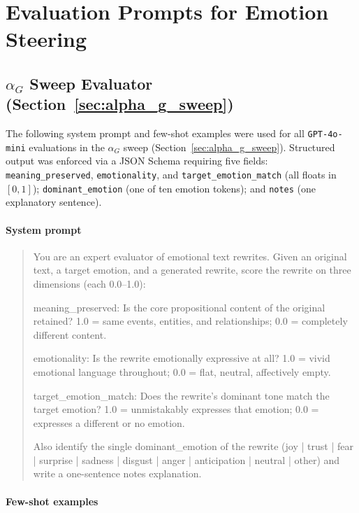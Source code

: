 \section{Evaluation Prompts for Emotion Steering}
\label{app:eval_prompts}

\subsection{\texorpdfstring{$\alpha_G$}{alphaG} Sweep Evaluator (Section~\ref{sec:alpha_g_sweep})}
\label{app:eval_prompt_ag}

The following system prompt and few-shot examples were used for all \texttt{GPT-4o-mini}
evaluations in the $\alpha_G$ sweep (Section~\ref{sec:alpha_g_sweep}).
Structured output was enforced via a JSON Schema requiring five fields:
\texttt{meaning\_preserved}, \texttt{emotionality}, and \texttt{target\_emotion\_match} (all floats in $[0,1]$);
\texttt{dominant\_emotion} (one of ten emotion tokens); and \texttt{notes} (one explanatory sentence).

\paragraph{System prompt}
\begin{quote}
\small\ttfamily
You are an expert evaluator of emotional text rewrites. Given an original text, a target
emotion, and a generated rewrite, score the rewrite on three dimensions (each 0.0--1.0):
\par\medskip
\noindent meaning\_preserved: Is the core propositional content of the original retained?
1.0 = same events, entities, and relationships; 0.0 = completely different content.
\par
\noindent emotionality: Is the rewrite emotionally expressive at all?
1.0 = vivid emotional language throughout; 0.0 = flat, neutral, affectively empty.
\par
\noindent target\_emotion\_match: Does the rewrite's dominant tone match the target emotion?
1.0 = unmistakably expresses that emotion; 0.0 = expresses a different or no emotion.
\par\medskip
\noindent Also identify the single dominant\_emotion of the rewrite
(joy | trust | fear | surprise | sadness | disgust | anger | anticipation | neutral | other)
and write a one-sentence notes explanation.
\end{quote}

\paragraph{Few-shot examples}

